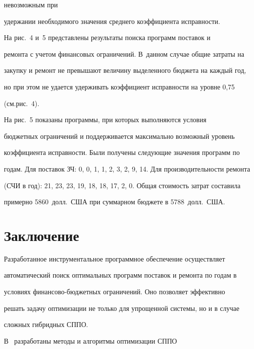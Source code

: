  невозможным при

удержании необходимого значения среднего коэффициента исправности.







     На рис.~4 и~5 представлены результаты поиска программ поставок и

ремонта с учетом финансовых ограничений. В~данном случае общие затраты на

закупку и ремонт не превышают величину выделенного бюджета на каждый год,

но при этом не удается удерживать коэффициент исправности на уровне 0,75

(см.\linebreak рис.~4).



На рис.~5 показаны программы, при которых выполняются условия

бюджетных ограничений и поддерживается максимально возможный уровень

коэффициента исправности. Были получены следующие значения программ по

годам. Для поставок ЗЧ: 0, 0, 1, 1, 2, 3, 2, 9, 14. Для производительности ремонта

(СЧИ в год): 21, 23, 23, 19, 18, 18, 17, 2, 0. Общая стоимость затрат составила

примерно 5860~долл.\ США при суммарном бюджете в 5788~долл.\ США.





\section{Заключение}



    Разработанное инструментальное программное обеспечение осуществляет

автоматический поиск оптимальных программ поставок и ремонта по годам в

условиях фи\-нан\-со\-во-бюд\-жет\-ных ограничений. Оно позволяет эффективно

решать задачу оптимизации не только для упрощенной системы, но и в случае

сложных гибридных СППО.



    В~\cite{17-sin, 19-sin} разработаны методы и алгоритмы оптимизации СППО

